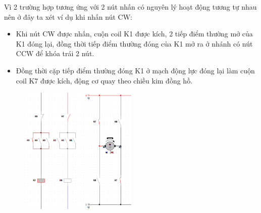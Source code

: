 Vì 2 trường hợp tương ứng với 2 nút nhấn có nguyên lý hoạt động tương tự nhau nên ở đây ta xét ví dụ khi nhấn nút CW:
\begin{itemize}
    \item Khi nút CW được nhấn, cuộn coil K1 được kích, 2 tiếp điểm thường mở của K1 đóng lại, đồng thời tiếp điểm thường đóng của K1 mở ra ở nhánh có nút CCW để khóa trái 2 nút.
\end{itemize}
\begin{figure}[H]
    \centering
\end{figure}
\begin{itemize}
    \item Đồng thời cặp tiếp điểm thường đóng K1 ở mạch động lực đóng lại làm cuộn coil K7 được kích, động cơ quay theo chiều kim đồng hồ.
\end{itemize}
\begin{figure}[H]
    \centering
    \includegraphics[width=0.5\textwidth]{pictures/kichK1.png}
\end{figure}
